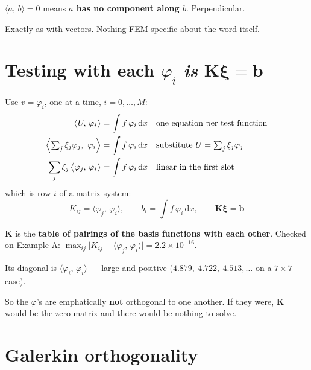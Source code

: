 \documentclass[11pt]{article}
\newcommand{\dx}{\,\mathrm{d}x}
\newcommand{\ip}[2]{\bigl\langle #1,\,#2\bigr\rangle}
\newcommand{\Kmat}{\bm{K}}
\begin{document}
\begin{pts}
\item $\ip{a}{b}=0$ means \textbf{$a$ has no component along $b$}. Perpendicular.
\item Exactly as with vectors. Nothing FEM-specific about the word itself.
\end{pts}

\section{\texorpdfstring{Testing with each $\varphi_i$ \emph{is} $\Kmat\bm{\xi}=\bm{b}$}{Testing with each phi\_i is K xi = b}}

Use $v=\varphi_i$, one at a time, $i=0,\dots,M$:
\begin{align*}
  \ip{U}{\varphi_i} &= \int f\,\varphi_i\dx
     && \text{one equation per test function}\\
  \Bigl\langle\textstyle\sum_j\xi_j\varphi_j,\ \varphi_i\Bigr\rangle
     &= \int f\,\varphi_i\dx
     && \text{substitute }U=\textstyle\sum_j\xi_j\varphi_j\\
  \sum_j \xi_j\,\ip{\varphi_j}{\varphi_i} &= \int f\,\varphi_i\dx
     && \text{linear in the first slot}
\end{align*}
which is row $i$ of a matrix system:
\[
  \boxed{\;K_{ij}=\ip{\varphi_j}{\varphi_i},\qquad
         b_i=\int f\,\varphi_i\dx,\qquad \Kmat\bm{\xi}=\bm{b}\;}
\]

\begin{pts}
\item $\Kmat$ is the \textbf{table of pairings of the basis functions with each
      other}. Checked on Example A: $\max_{ij}\bigl|K_{ij}-\ip{\varphi_j}{\varphi_i}\bigr|
      =2.2\times10^{-16}$.
\item Its diagonal is $\ip{\varphi_i}{\varphi_i}$ --- large and positive
      ($4.879,\ 4.722,\ 4.513,\dots$ on a $7\times7$ case).
\item So the $\varphi$'s are emphatically \textbf{not} orthogonal to one
      another. If they were, $\Kmat$ would be the zero matrix and there would be
      nothing to solve.
\end{pts}

\section{Galerkin orthogonality}
\end{document}

